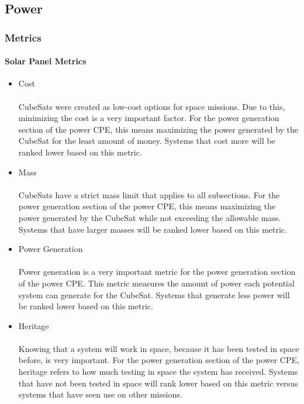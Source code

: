 
\subsection{Power}
\subsubsection{Metrics}
\paragraph{Solar Panel Metrics}
\begin{itemize}
\item Cost\\
\\
CubeSats were created as low-cost options for space missions.  Due to this, minimizing the cost is a very important factor.  For the power generation section of the power CPE, this means maximizing the power generated by the CubeSat for the least amount of money. Systems that cost more will be ranked lower based on this metric.
\\
\item{Mass} \\
\\
CubeSats have a strict mass limit that applies to all subsections. For the power generation section of the power CPE, this means maximizing the power generated by the CubeSat while not exceeding the allowable mass.  Systems that have larger masses will be ranked lower based on this metric.
\\
\item{Power Generation} \\
\\
Power generation is a very important metric for the power generation section of the power CPE.  This metric measures the amount of power each potential system can generate for the CubeSat. Systems that generate less power will be ranked lower based on this metric.
\\
\item{Heritage} \\
\\
Knowing that a system will work in space, because it has been tested in space before, is very important. For the power generation section of the power CPE, heritage refers to how much testing in space the system has received.  Systems that have not been tested in space will rank lower based on this metric versus systems that have seen use on other missions.
\end{itemize}

